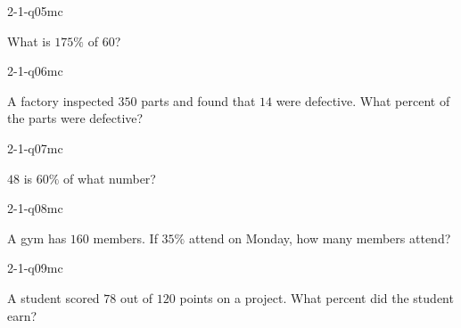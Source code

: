 \begin{practiceQuestion}{2-1-q05}{mc}
\begin{questionText}
What is $175\%$ of $60$?
\end{questionText}
\end{practiceQuestion}

\begin{practiceQuestion}{2-1-q06}{mc}
\begin{questionText}
A factory inspected $350$ parts and found that $14$ were defective. What percent of the parts were defective?
\end{questionText}
\end{practiceQuestion}

\begin{practiceQuestion}{2-1-q07}{mc}
\begin{questionText}
$48$ is $60\%$ of what number?
\end{questionText}
\end{practiceQuestion}

\begin{practiceQuestion}{2-1-q08}{mc}
\begin{questionText}
A gym has $160$ members. If $35\%$ attend on Monday, how many members attend?
\end{questionText}
\end{practiceQuestion}

\begin{practiceQuestion}{2-1-q09}{mc}
\begin{questionText}
A student scored $78$ out of $120$ points on a project. What percent did the student earn?
\end{questionText}
\end{practiceQuestion}

